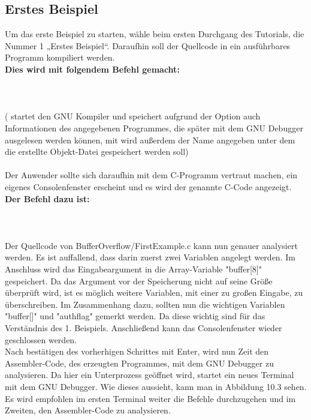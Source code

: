 \subsection{Erstes Beispiel}
Um das erste Beispiel zu starten, wähle beim ersten Durchgang des Tutorials, die Nummer 1 „Erstes Beispiel“.
Daraufhin soll der Quellcode in ein ausführbares Programm kompiliert werden.\\ \textbf{Dies wird mit folgendem Befehl gemacht:}\\\\
\\\\
( startet den GNU Kompiler und speichert aufgrund der Option  auch Informationen des angegebenen Programmes, die später mit dem GNU Debugger ausgelesen werden können, mit  wird außerdem der Name angegeben unter dem die erstellte Objekt-Datei gespeichert werden soll)\\\\
Der Anwender sollte sich daraufhin mit dem C-Programm vertraut machen, ein eigenes Consolenfenster erscheint und es wird der genannte C-Code angezeigt.\\ \textbf{Der Befehl dazu ist:}\\\\
\\\\
Der Quellcode von BufferOverflow/FirstExample.c kann nun genauer analysiert werden. Es ist auffallend, dass darin zuerst zwei Variablen angelegt werden.
Im Anschluss wird das Eingabeargument in die Array-Variable "buffer[8]" gespeichert. Da das Argument vor der Speicherung nicht auf seine Größe überprüft wird, ist es möglich weitere Variablen, mit einer zu großen Eingabe, zu überschreiben.
Im Zusammenhang dazu, sollten nun die wichtigen Variablen "buffer[]" und "authflag" gemerkt werden. Da diese wichtig sind für das Verständnis des 1. Beispiels. Anschließend kann das Consolenfenster wieder geschlossen werden.\\
Nach bestätigen des vorherhigen Schrittes mit Enter, wird nun Zeit den Assembler-Code, des erzeugten Programmes, mit dem GNU Debugger zu analysieren. Da hier ein Unterprozess geöffnet wird, startet ein neues Terminal mit dem GNU Debugger. Wie dieses aussieht, kann man in Abbildung 10.3 sehen. Es wird empfohlen im ersten Terminal weiter die Befehle durchzugehen und im Zweiten, den Assembler-Code zu analysieren. 
